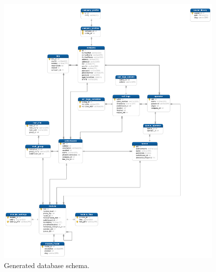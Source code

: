 \begin{figure}[!ht]
  \caption{Generated database schema.}
  \centering
    \includegraphics[width=1\textwidth]{img/db.png}
\end{figure}
